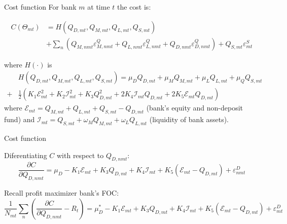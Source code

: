 \documentclass[notes,11pt, aspectratio=169]{beamer}
\begin{document}
\begin{frame}{Cost function}
    \vspace{0.5cm}
For bank $m$ at time $t$ the cost is:

\begin{equation}
    \begin{aligned}
    C\left(\Theta_{m t}\right) & =H\left(Q_{D, m t}, Q_{M, m t}, Q_{L, m t}, Q_{S, m t}\right) \\
    & +\sum_n\left(Q_{M, n m t} \varepsilon_{M, n m t}^Q+Q_{L, n m t} \varepsilon_{L, n m t}^Q+Q_{D, n m t} \varepsilon_{D, n m t}^Q\right)+Q_{S, m t} \varepsilon_{m t}^S
    \end{aligned}
    \end{equation}

    where $H(\cdot)$ is 
    $$
    \begin{aligned}
    & H\left(Q_{D, m t}, Q_{M, m t}, Q_{L, m t}, Q_{S, m t}\right)=\mu_D Q_{D, m t}+\mu_M Q_{M, m t}+\mu_L Q_{L, m t}+\mu_Q Q_{S, m t} \\
    + & \frac{1}{2}\left(K_1 \mathcal{E}_{m t}^2+K_2 \mathcal{I}_{m t}^2+K_3 Q_{D, m t}^2+2 K_4 \mathcal{I}_{m t} Q_{D, m t}+2 K_5 \mathcal{E}_{m t} Q_{D, m t}\right)
    \end{aligned}
    $$
    where $\mathcal{E}_{m t}=Q_{M, m t}+Q_{L, m t}+Q_{S, m t}-Q_{D, m t}$ (bank's equity and non-deposit fund) and $\mathcal{I}_{m t}=Q_{S, m t}+\omega_M Q_{M, m t}+\omega_L Q_{L, m t}$ (liquidity of bank assets).
\end{frame}


    \begin{frame}{Cost function}
        \vspace{0.5cm}

        Diferentiating $C$ with respect to $Q_{D, n m t}$:
    \begin{equation}
        \frac{\partial C}{\partial Q_{D, n m t}}=\mu_D-K_1 \mathcal{E}_{m t}+K_3 Q_{D, m t}+K_4 \mathcal{I}_{m t}+K_5\left(\mathcal{E}_{m t}-Q_{D, m t}\right)+\varepsilon_{n m t}^D
        \end{equation}

        Recall profit maximizer bank's FOC:
        \begin{equation}
            \frac{1}{N_{m t}} \sum_n\left(\frac{\partial C}{\partial Q_{D, n m t}}-R_t\right)=\mu_D^*-K_1 \mathcal{E}_{m t}+K_3 Q_{D, m t}+K_4 \mathcal{I}_{m t}+K_5\left(\mathcal{E}_{m t}-Q_{D, m t}\right)+\varepsilon_{m t}^D
            \end{equation}

        \end{frame}
\end{document}
